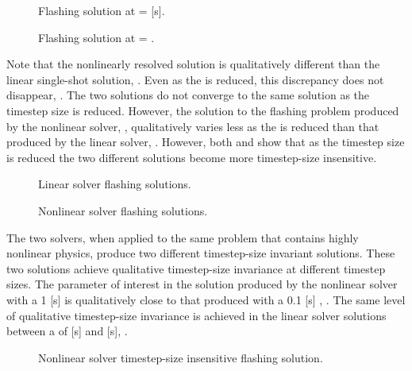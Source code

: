 \begin{figure}[h!tb]
\centering

\caption{Flashing solution at \dtmax{} =  {[s]}.}
\label{fig:flashing1pt0000em0}
\end{figure}

\begin{figure}[h!tb]
\centering

\caption{Flashing solution at \dtmax{} = .}
\label{fig:flashing1pt0000em5}
\end{figure}

Note that the nonlinearly resolved solution is qualitatively different than the linear single-shot solution, .
Even as the \dtmax{} is reduced, this discrepancy does not disappear, .
The two solutions do not converge to the same solution as the timestep size is reduced.
However, the solution to the flashing problem produced by the nonlinear solver, , qualitatively varies less as the \dtmax{} is reduced than that produced by the linear solver, .
However, both  and  show that as the timestep size is reduced the two different solutions become more timestep-size insensitive.

\begin{figure}[h!tb]
\centering

\caption{Linear solver flashing solutions.}
\label{fig:flashingAlphaLin}
\end{figure}

\begin{figure}[h!tb]
\centering

\caption{Nonlinear solver flashing solutions.}
\label{fig:flashingAlphaNln}
\end{figure}

The two solvers, when applied to the same problem that contains highly nonlinear physics, produce two different timestep-size invariant solutions.
These two solutions achieve qualitative timestep-size invariance at different timestep sizes.
The parameter of interest in the solution produced by the nonlinear solver with a 1 [s] \dtmax{} is qualitatively close to that produced with a 0.1 [s] \dtmax{}, .
The same level of qualitative timestep-size invariance is achieved in the linear solver solutions between a \dtmax{} of  [s] and  [s], .

\begin{figure}[h!tb]
\centering

\caption{Nonlinear solver timestep-size insensitive flashing solution.}
\label{fig:flashingDtInsensitiveNln}
\end{figure}

